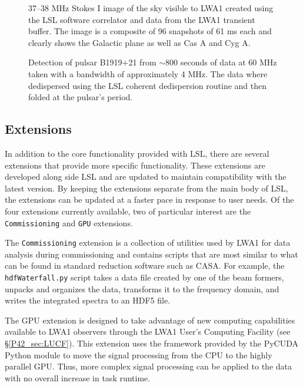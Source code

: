 \begin{figure}
	\caption{\label{P42_fig:sky}37--38 MHz Stokes I image of the sky visible to LWA1 created using the LSL software correlator and data from the LWA1 transient buffer.  The image is a composite of 96 snapshots of 61 ms each and clearly shows the Galactic plane as well as Cas A and Cyg A.}
\end{figure}

\begin{figure}
	\caption{\label{P42_fig:psr}Detection of pulsar B1919+21 from $\sim$800 seconds of data at 60 MHz taken with a bandwidth of approximately 4 MHz.  The data where dedispersed using the LSL coherent dedispersion routine and then folded at the pulsar's period.}
\end{figure}

\subsection{Extensions}
In addition to the core functionality provided with LSL, there are several extensions that provide more specific functionality.  These extensions are developed along side LSL and  are updated to maintain compatibility with the latest version.  By keeping the extensions separate from the main body of LSL, the extensions can be updated at a faster pace in response to user needs.  Of the four extensions currently available, two of particular interest are the {\tt Commissioning} and {\tt GPU} extensions.

The {\tt Commissioning} extension is a collection of utilities used by LWA1 for data analysis during commissioning and contains scripts that are most similar to what can be found in standard reduction software such as CASA.  For example, the {\tt hdfWaterfall.py} script takes a data file created by one of the beam formers, unpacks and organizes the data, transforms it to the frequency domain, and writes the integrated spectra to an HDF5 file.  

 The GPU extension is designed to take advantage of new computing capabilities available to LWA1 observers through the LWA1 User's Computing Facility (see \S\ref{P42_sec:LUCF}).  This extension uses the framework provided by the PyCUDA \citep{PyCUDA} Python module to move the signal processing from the CPU to the highly parallel GPU.  Thus, more complex signal processing can be applied to the data with no overall increase in task runtime.

